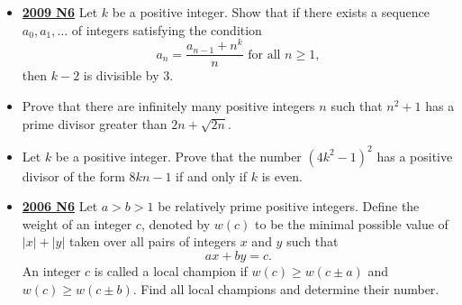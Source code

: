 \documentclass[11pt]{scrartcl}
\begin{document}
\begin{itemize}[leftmargin=*]
\item \href{https://artofproblemsolving.com/community/c6h355800p1932946}{\textbf{2009 N6}} Let $k$ be a positive integer. Show that if there exists a sequence $a_0,a_1,\dots$ of integers satisfying the condition\[a_n=\frac{a_{n-1}+n^k}{n}\text{ for all } n\geqslant  1,\]then $k-2$ is divisible by $3$.
\item {} Prove that there are infinitely many positive integers $ n$ such that $ n^{2} + 1$ has a prime divisor greater than $ 2n + \sqrt {2n}$.
\item {} Let $ k$ be a positive integer. Prove that the number $ (4k^2 - 1)^2$ has a positive divisor of the form $ 8kn - 1$ if and only if $ k$ is even.
\item \href{https://artofproblemsolving.com/community/c6h155721p875072}{\textbf{2006 N6}} Let $ a > b > 1$ be relatively prime positive integers. Define the weight of an integer $ c$, denoted by $ w(c)$ to be the minimal possible value of $ |x| + |y|$ taken over all pairs of integers $ x$ and $ y$ such that\[ax + by = c.\]An integer $ c$ is called a local champion if $ w(c) \geqslant  w(c \pm a)$ and $ w(c) \geqslant  w(c \pm b)$. Find all local champions and determine their number.
\end{itemize}


\newpage
\end{document}
